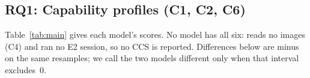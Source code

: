 \subsection{RQ1: Capability profiles (C1, C2, C6)}\label{sec:rq1}
Table~\ref{tab:main} gives each model's scores. No model has all six: \Q{} reads no images (C4)
and \QV{} ran no E2 session, so no CCS is reported. Differences below are \QV{} minus \Q{} on the
same resamples; we call the two models different only when that interval excludes~0.

